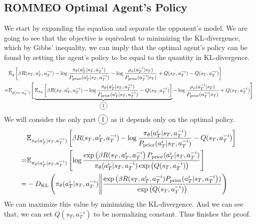 \subsection{ROMMEO Optimal Agent's Policy}
\label{appx:chap3-ROMMEO-agent-last-time}
We start by expanding the equation and separate the opponent's model. We are going to see that the objective is equivalent to minimizing the KL-divergence, which by Gibbs' inequality, we can imply that the optimal agent's policy can be found by setting the agent's policy to be equal to the quantity in KL-divergence. 
\begin{equation*}
\begin{aligned}
    &\mathbb{E}_{q}\brackb{ \beta R(s_T, a^i_T, a^{-i}_T)  - \log \frac{\pi_{\theta}(a^i_T | s_T, a^{-i}_T)}{P_{\prior}(a^i_T | s_T, a^{-i}_T) } - \log \frac{\rho_{\phi}(a^{-i}_T | s_T)}{P_{\prior}(a^{-i}_T | s_T)} + Q(s_T, a^{-i}_T) - Q(s_T, a^{-i}_T) } \\
    =&  \mathbb{E}_{q(s_T, a^{-i}_T)}\Bigg[\underbrace{\mathbb{E}_{\pi_{\theta}}\brackb{\beta R(s_T, a^i_T, a^{-i}_T)  - \log \frac{\pi_{\theta}(a^i_T | s_T, a^{-i}_T)}{P_{\prior}(a^i_T | s_T, a^{-i}_T) } - Q(s_T, a^{-i}_T)}}_{\circled{1}} - \log \frac{\rho_{\phi}(a^{-i}_T | s_T)}{P_{\prior}(a^{-i}_T | s_T)} + Q(s_T, a^{-i}_T)\Bigg] \\
\end{aligned}    
\end{equation*}
We will consider the only part $\circled{1}$ as it depends only on the optimal policy. 
\begin{equation*}
\begin{aligned}
    &\mathbb{E}_{\pi_{\theta}(a^i_T | s_T, a^{-i}_T)}\left[ \beta R(s_T, a^i_T, a^{-i}_T)  - \log \frac{\pi_{\theta}(a^i_T | s_T, a^{-i}_T)}{P_{\text{prior}}(a^i_T | s_T, a^{-i}_T) } - Q(s_T, a^{-i}_T) \right] \\
    =&\mathbb{E}_{\pi_{\theta}(a^i_T | s_T, a^{-i}_T)}\left[ \log \frac{\exp \left( \beta R(s_T, a^i_T, a^{-i}_T \right)P_{\text{prior}}(a^i_T | s_T, a^{-i}_T) }{\pi_{\theta}(a^i_T | s_T, a^{-i}_T) \exp\left( Q(s_T, a^{-i}_T) \right)} \right] \\
    =& - D_{\mathrm{KL}}\left( \pi_{\theta}(a^i_T | s_T, a^{-i}_T) \Bigg\| \frac{\exp \left( \beta R(s_T, a^i_T, a^{-i}_T)P_{\text{prior}}(a^i_T | s_T, a^{-i}_T \right)) }{\exp\left( Q(s_T, a^{-i}_T) \right)}   \right)
\end{aligned}
\end{equation*}
We can maximize this value by minimizing the KL-divergence. And we can see that, we can set $Q(s_T, a^{-i}_T)$ to be normalizing constant. Thus finishes the proof. 


